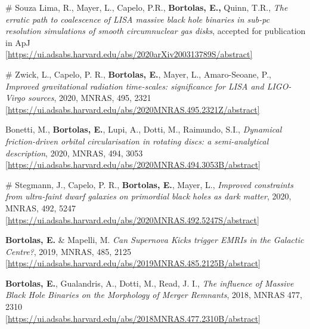\begin{etaremune}


\item  \# Souza Lima, R., Mayer, L., Capelo, P.R., \textbf{Bortolas, E.,} Quinn, T.R., { \it The erratic path to coalescence of LISA massive black hole binaries in sub-pc resolution simulations of smooth circumnuclear gas disks}, accepted for publication in ApJ \\ \href{https://ui.adsabs.harvard.edu/abs/2020arXiv200313789S/abstract}{\scriptsize [https://ui.adsabs.harvard.edu/abs/2020arXiv200313789S/abstract]}

\item  \# Zwick, L., Capelo, P. R., \textbf{Bortolas, E.}, Mayer, L., Amaro-Seoane, P., { \it Improved gravitational radiation time-scales: significance for LISA and LIGO-Virgo sources}, 2020, MNRAS, 495, 2321 \\ \href{https://ui.adsabs.harvard.edu/abs/2020MNRAS.495.2321Z/abstract}{\scriptsize [https://ui.adsabs.harvard.edu/abs/2020MNRAS.495.2321Z/abstract]}

\item   Bonetti, M., \textbf{Bortolas, E.}, Lupi, A., Dotti, M., Raimundo, S.I., { \it Dynamical friction-driven orbital circularisation in rotating discs: a semi-analytical description}, 2020, MNRAS, 494, 3053 \\ \href{https://ui.adsabs.harvard.edu/abs/2020MNRAS.494.3053B/abstract}{\scriptsize [https://ui.adsabs.harvard.edu/abs/2020MNRAS.494.3053B/abstract]}

\item  \# Stegmann, J., Capelo, P. R.,  {\bf Bortolas, E.}, Mayer, L., { \it Improved constraints from ultra-faint dwarf galaxies on primordial black holes as dark matter}, 2020, MNRAS, 492, 5247\\ \href{https://ui.adsabs.harvard.edu/abs/2020MNRAS.492.5247S/abstract}{\scriptsize [https://ui.adsabs.harvard.edu/abs/2020MNRAS.492.5247S/abstract]}

\item {\bf Bortolas, E.} \& Mapelli, M. { \it Can Supernova Kicks trigger EMRIs in the Galactic Centre?}, 2019, MNRAS, 485, 2125 \\ \href{https://ui.adsabs.harvard.edu/abs/2019MNRAS.485.2125B/abstract}{\scriptsize [https://ui.adsabs.harvard.edu/abs/2019MNRAS.485.2125B/abstract]}

\item {\bf Bortolas, E.}, Gualandris, A., Dotti, M., Read, J. I., { \it The influence of Massive Black Hole Binaries on the Morphology of Merger Remnants},  2018, MNRAS 477, 2310 \\ \href{https://ui.adsabs.harvard.edu/abs/2018MNRAS.477.2310B/abstract}{\scriptsize [https://ui.adsabs.harvard.edu/abs/2018MNRAS.477.2310B/abstract]}


\end{etaremune}

